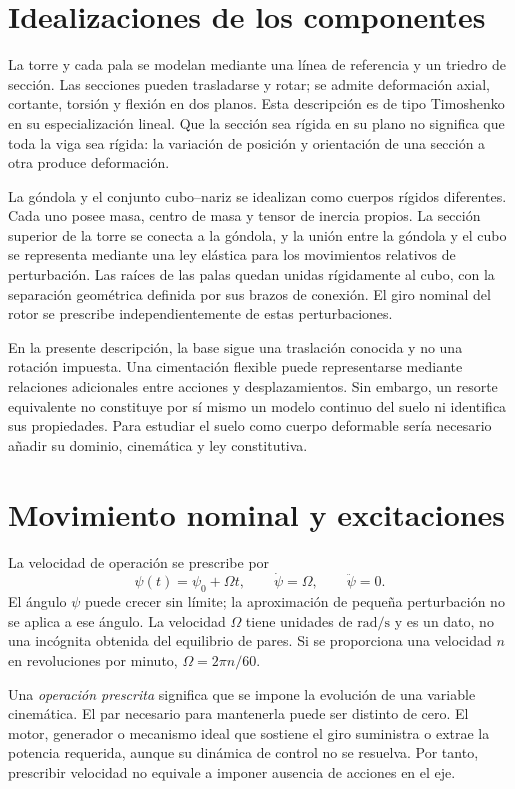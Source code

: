 \section{Idealizaciones de los componentes}
La torre y cada pala se modelan mediante una línea de referencia y un triedro de sección. Las secciones pueden trasladarse y rotar; se admite deformación axial, cortante, torsión y flexión en dos planos. Esta descripción es de tipo Timoshenko en su especialización lineal. Que la sección sea rígida en su plano no significa que toda la viga sea rígida: la variación de posición y orientación de una sección a otra produce deformación.

La góndola y el conjunto cubo--nariz se idealizan como cuerpos rígidos diferentes. Cada uno posee masa, centro de masa y tensor de inercia propios. La sección superior de la torre se conecta a la góndola, y la unión entre la góndola y el cubo se representa mediante una ley elástica para los movimientos relativos de perturbación. Las raíces de las palas quedan unidas rígidamente al cubo, con la separación geométrica definida por sus brazos de conexión. El giro nominal del rotor se prescribe independientemente de estas perturbaciones.

En la presente descripción, la base sigue una traslación conocida y no una rotación impuesta. Una cimentación flexible puede representarse mediante relaciones adicionales entre acciones y desplazamientos. Sin embargo, un resorte equivalente no constituye por sí mismo un modelo continuo del suelo ni identifica sus propiedades. Para estudiar el suelo como cuerpo deformable sería necesario añadir su dominio, cinemática y ley constitutiva.

\section{Movimiento nominal y excitaciones}
La velocidad de operación se prescribe por
\begin{equation}
 \psi(t)=\psi_0+\Omega t,\qquad \dot\psi=\Omega,\qquad \ddot\psi=0.
 \label{eq:psi}
\end{equation}
El ángulo $\psi$ puede crecer sin límite; la aproximación de pequeña perturbación no se aplica a ese ángulo. La velocidad $\Omega$ tiene unidades de $\mathrm{rad/s}$ y es un dato, no una incógnita obtenida del equilibrio de pares. Si se proporciona una velocidad $n$ en revoluciones por minuto, $\Omega=2\pi n/60$.

Una \emph{operación prescrita} significa que se impone la evolución de una variable cinemática. El par necesario para mantenerla puede ser distinto de cero. El motor, generador o mecanismo ideal que sostiene el giro suministra o extrae la potencia requerida, aunque su dinámica de control no se resuelva. Por tanto, prescribir velocidad no equivale a imponer ausencia de acciones en el eje.

